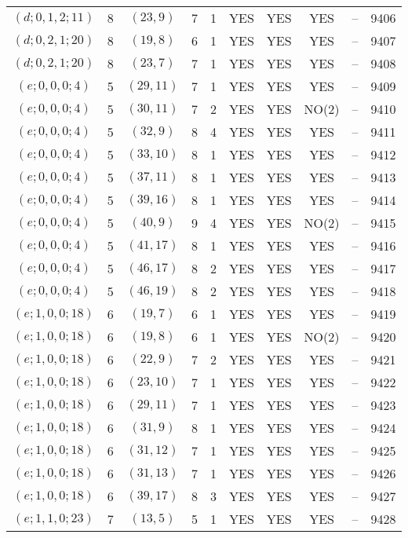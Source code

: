 \begin{longtable}{|c|c|c|c|c|c|c|c|c|c|}
$(d; 0, 1, 2; 11)$ & 8 & $(23, 9)$ & 7 & 1 & YES & YES & YES & -- & 9406\\
$(d; 0, 2, 1; 20)$ & 8 & $(19, 8)$ & 6 & 1 & YES & YES & YES & -- & 9407\\
$(d; 0, 2, 1; 20)$ & 8 & $(23, 7)$ & 7 & 1 & YES & YES & YES & -- & 9408\\
$(e; 0, 0, 0; 4)$ & 5 & $(29, 11)$ & 7 & 1 & YES & YES & YES & -- & 9409\\
$(e; 0, 0, 0; 4)$ & 5 & $(30, 11)$ & 7 & 2 & YES & YES & NO(2) & -- & 9410\\
$(e; 0, 0, 0; 4)$ & 5 & $(32, 9)$ & 8 & 4 & YES & YES & YES & -- & 9411\\
$(e; 0, 0, 0; 4)$ & 5 & $(33, 10)$ & 8 & 1 & YES & YES & YES & -- & 9412\\
$(e; 0, 0, 0; 4)$ & 5 & $(37, 11)$ & 8 & 1 & YES & YES & YES & -- & 9413\\
$(e; 0, 0, 0; 4)$ & 5 & $(39, 16)$ & 8 & 1 & YES & YES & YES & -- & 9414\\
$(e; 0, 0, 0; 4)$ & 5 & $(40, 9)$ & 9 & 4 & YES & YES & NO(2) & -- & 9415\\
$(e; 0, 0, 0; 4)$ & 5 & $(41, 17)$ & 8 & 1 & YES & YES & YES & -- & 9416\\
$(e; 0, 0, 0; 4)$ & 5 & $(46, 17)$ & 8 & 2 & YES & YES & YES & -- & 9417\\
$(e; 0, 0, 0; 4)$ & 5 & $(46, 19)$ & 8 & 2 & YES & YES & YES & -- & 9418\\
$(e; 1, 0, 0; 18)$ & 6 & $(19, 7)$ & 6 & 1 & YES & YES & YES & -- & 9419\\
$(e; 1, 0, 0; 18)$ & 6 & $(19, 8)$ & 6 & 1 & YES & YES & NO(2) & -- & 9420\\
$(e; 1, 0, 0; 18)$ & 6 & $(22, 9)$ & 7 & 2 & YES & YES & YES & -- & 9421\\
$(e; 1, 0, 0; 18)$ & 6 & $(23, 10)$ & 7 & 1 & YES & YES & YES & -- & 9422\\
$(e; 1, 0, 0; 18)$ & 6 & $(29, 11)$ & 7 & 1 & YES & YES & YES & -- & 9423\\
$(e; 1, 0, 0; 18)$ & 6 & $(31, 9)$ & 8 & 1 & YES & YES & YES & -- & 9424\\
$(e; 1, 0, 0; 18)$ & 6 & $(31, 12)$ & 7 & 1 & YES & YES & YES & -- & 9425\\
$(e; 1, 0, 0; 18)$ & 6 & $(31, 13)$ & 7 & 1 & YES & YES & YES & -- & 9426\\
$(e; 1, 0, 0; 18)$ & 6 & $(39, 17)$ & 8 & 3 & YES & YES & YES & -- & 9427\\
$(e; 1, 1, 0; 23)$ & 7 & $(13, 5)$ & 5 & 1 & YES & YES & YES & -- & 9428\\

\end{longtable}
